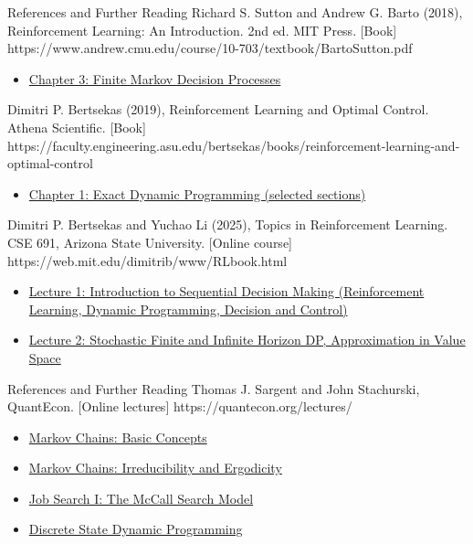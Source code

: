 \begin{frame}{References and Further Reading}
  {Richard S. Sutton and Andrew G. Barto (2018), Reinforcement Learning: An Introduction. 2nd ed. MIT Press. [Book]}
  {https://www.andrew.cmu.edu/course/10-703/textbook/BartoSutton.pdf}
  {\begin{itemize}
\item \href{https://www.andrew.cmu.edu/course/10-703/textbook/BartoSutton.pdf\#page=69}{Chapter 3: Finite Markov Decision Processes}
\end{itemize}}
  {Dimitri P. Bertsekas (2019), Reinforcement Learning and Optimal Control. Athena Scientific. [Book]}
  {https://faculty.engineering.asu.edu/bertsekas/books/reinforcement-learning-and-optimal-control}
  {\begin{itemize}
\item \href{https://faculty.engineering.asu.edu/sites/g/files/litvpz5506/files/2026-06/RL_1-SHORT-INTERNET-POSTED.pdf}{Chapter 1: Exact Dynamic Programming (selected sections)}
\end{itemize}}
  {Dimitri P. Bertsekas and Yuchao Li (2025), Topics in Reinforcement Learning. CSE 691, Arizona State University. [Online course]}
  {https://web.mit.edu/dimitrib/www/RLbook.html}
  {\begin{itemize}
\item \href{https://web.mit.edu/dimitrib/www/RLTopics_2025_Lect1.pdf}{Lecture 1: Introduction to Sequential Decision Making (Reinforcement Learning, Dynamic Programming, Decision and Control)}
\item \href{https://web.mit.edu/dimitrib/www/RLTopics_2025_Lect2.pdf}{Lecture 2: Stochastic Finite and Infinite Horizon DP, Approximation in Value Space}
\end{itemize}}
\end{frame}
\begin{frame}{References and Further Reading}
  {Thomas J. Sargent and John Stachurski, QuantEcon. [Online lectures]}
  {https://quantecon.org/lectures/}
  {\begin{itemize}
\item \href{https://intro.quantecon.org/markov_chains_I.html}{Markov Chains: Basic Concepts}
\item \href{https://intro.quantecon.org/markov_chains_II.html}{Markov Chains: Irreducibility and Ergodicity}
\item \href{https://python.quantecon.org/mccall_model.html}{Job Search I: The McCall Search Model}
\item \href{https://tools-techniques.quantecon.org/discrete_dp.html}{Discrete State Dynamic Programming}
\end{itemize}}
\end{frame}

